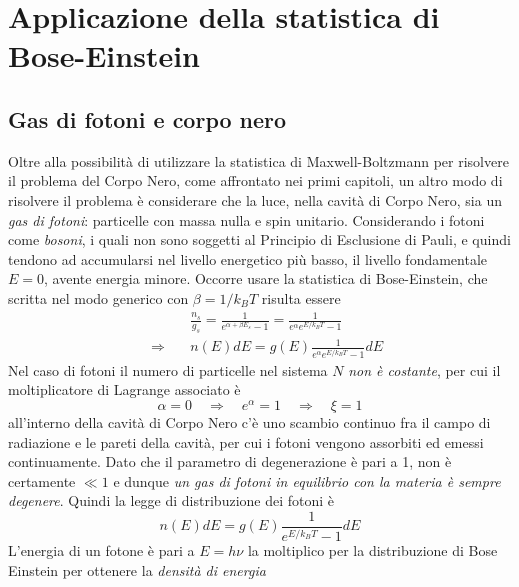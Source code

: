 

\section{Applicazione della statistica di Bose-Einstein}


\subsection{Gas di fotoni e corpo nero}
Oltre alla possibilità di utilizzare la statistica di Maxwell-Boltzmann per risolvere il problema del Corpo Nero, come affrontato nei primi capitoli, un altro modo di risolvere il problema è considerare che la luce, nella cavità di Corpo Nero, sia un \textit{gas di fotoni}: particelle con massa nulla e spin unitario.
Considerando i fotoni come \textit{bosoni}, i quali non sono soggetti al Principio di Esclusione di Pauli, e quindi tendono ad accumularsi nel livello energetico più basso, il livello fondamentale $E=0$, avente energia minore.
Occorre usare la statistica di Bose-Einstein, che scritta nel modo generico con $\beta = 1/ k_B T$ risulta essere
\begin{equation}
\begin{split}
& \frac{ n_s}{g_s } = \frac{ 1}{e^{ \alpha + \beta E_s } - 1 } = \frac{ 1}{e^{ \alpha} e^{ E / k_B T } - 1 } \\
\quad\Rightarrow\quad & n(E)dE = g(E) \frac{ 1}{e^{ \alpha} e^{ E / k_B T } - 1 } dE
\end{split}
\end{equation}
Nel caso di fotoni il numero di particelle nel sistema $N$ \textit{non è costante}, per cui il moltiplicatore di Lagrange associato è
\begin{equation}
\alpha = 0 \quad\Rightarrow\quad e^{\alpha} = 1 \quad\Rightarrow\quad  \xi = 1
\end{equation}
all'interno della cavità di Corpo Nero c'è uno scambio continuo fra il campo di radiazione e le pareti della cavità, per cui i fotoni vengono assorbiti ed emessi continuamente.
Dato che il parametro di degenerazione è pari a 1, non è certamente $\ll 1$ e dunque \emph{un gas di fotoni in equilibrio con la materia è sempre degenere}.
Quindi la legge di distribuzione dei fotoni è
\begin{equation}
n(E)dE = g(E) \frac{1}{e^{ E / k_B T } - 1 } dE
\end{equation}
L'energia di un fotone è pari a $E = h \nu$ la moltiplico per la distribuzione di Bose Einstein per ottenere la \textit{densità di energia}
